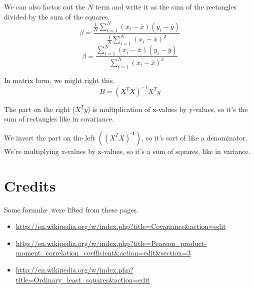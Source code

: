 \documentclass{article}
\begin{document}
We can also factor out the $N$ term and write it as the sum of the rectangles divided by the sum of the squares.
$$ \beta = \frac
{\frac{1}{N}\sum_{i=1}^{N}\left( x_{i}-\bar{x} \right) \left( y_{i}-\bar{y} \right)}
{\frac{1}{N}\sum_{i=1}^{N}\left( x_{i}-\bar{x} \right)^2}
$$
$$ \beta = \frac
{\sum_{i=1}^{N}\left( x_{i}-\bar{x} \right) \left( y_{i}-\bar{y} \right)}
{\sum_{i=1}^{N}\left( x_{i}-\bar{x} \right)^2}
$$

In matrix form, we might right this.
$$B = \left(X^TX\right)^{-1}X^Ty$$

The part on the right ($X^Ty$) is multiplication of x-values by y-values,
so it's the sum of rectangles like in covariance.

We invert the part on the left $\left(\left(X^TX\right)^\textbf{-1}\right)$,
so it's sort of like a denominator. We're multiplying x-values by
x-values, so it's a sum of squares, like in variance.

\section{Credits}
Some formul\ae\ were lifted from these pages.
\begin{itemize}
\item \url{http://en.wikipedia.org/w/index.php?title=Covariance&action=edit}
\item \url{http://en.wikipedia.org/w/index.php?title=Pearson_product-moment_correlation_coefficient&action=edit&section=3}
\item \url{http://en.wikipedia.org/w/index.php?title=Ordinary_least_squares&action=edit}
\end{itemize}
\end{document}
